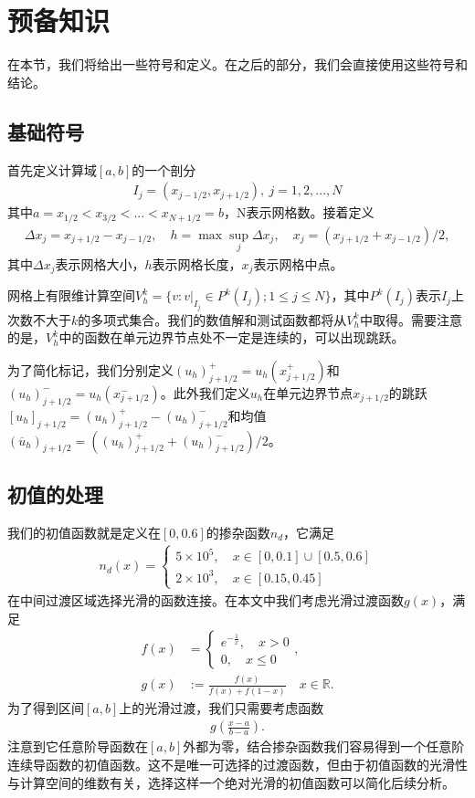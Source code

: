 \cleardoublepage

\section{预备知识}
在本节，我们将给出一些符号和定义。在之后的部分，我们会直接使用这些符号和结论。
\subsection{基础符号}
首先定义计算域$[a,b]$的一个剖分
\begin{align*}
    I_{j} = (x_{j-1/2}, x_{j+1/2}), \ j = 1, 2, ..., N
\end{align*}
其中$a=x_{1/2} < x_{3/2}< ...< x_{N+1/2}=b$，N表示网格数。接着定义
\begin{align*}
    \Delta x_j = x_{j+1/2}-x_{j-1/2}, \quad h = \max{\sup_j{\Delta x_j}}, \quad x_j = (x_{j+1/2}+x_{j-1/2})/{2},
\end{align*}
其中$\Delta x_j$表示网格大小，$h$表示网格长度，$x_j$表示网格中点。

网格上有限维计算空间$V_h^k = \{v:v|_{I_j}\in P^k(I_j); 1\leq j\leq N\}$，其中$P^k(I_j)$表示$I_j$上次数不大于$k$的多项式集合。我们的数值解和测试函数都将从$V_h^k$中取得。需要注意的是，$V_h^k$中的函数在单元边界节点处不一定是连续的，可以出现跳跃。

为了简化标记，我们分别定义$(u_h)^+_{j+1/2}=u_h(x^+_{j+1/2})$和$(u_h)^-_{j+1/2}=u_h(x^-_{j+1/2})$。此外我们定义$u_h$在单元边界节点$x_{j+1/2}$的跳跃$[u_h]_{j+1/2}=(u_h)^+_{j+1/2}-(u_h)^-_{j+1/2}$和均值$(\overline{u}_h)_{j+1/2}=((u_h)_{j+1/2}^++(u_h)_{j+1/2}^-)/2$。
\subsection{初值的处理}
我们的初值函数就是定义在$[0, 0.6]$的掺杂函数$n_d$，它满足
\begin{align*}
    n_d(x) = \begin{cases}
                 5\times 10^{5}, \quad x \in [0, 0.1] \cup [0.5, 0.6] \\
                 2\times 10^{3}, \quad x \in [0.15,0.45]
             \end{cases}
\end{align*}
在中间过渡区域选择光滑的函数连接。在本文中我们考虑光滑过渡函数$g(x)$，满足
\begin{align*}
    f(x)               & ={\begin{cases}
                               e^{-{\frac {1}{x}}}, \quad x>0 \\
                               0, \quad x\leq 0\end{cases}} ,                     \\
    \displaystyle g(x) & :={\frac {f(x)}{f(x)+f(1-x)}}\quad x\in \mathbb {R}.
\end{align*}
为了得到区间$[a,b]$上的光滑过渡，我们只需要考虑函数
\begin{align*}
    g(\frac{x-a}{b-a}).
\end{align*}
注意到它任意阶导函数在$[a,b]$外都为零，结合掺杂函数我们容易得到一个任意阶连续导函数的初值函数。这不是唯一可选择的过渡函数，但由于初值函数的光滑性与计算空间的维数有关，选择这样一个绝对光滑的初值函数可以简化后续分析。

